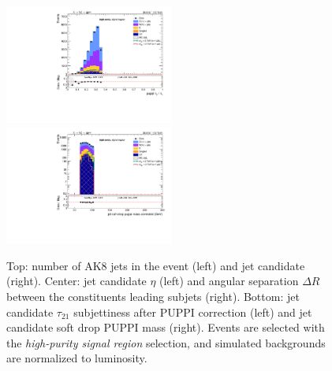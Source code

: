 \begin{figure}[!htb]
\begin{center}
    \includegraphics[width=0.495\textwidth]{plots/v9_thesis/XVZnnhpSR/FatJet1_puppiTau21.pdf}
    \includegraphics[width=0.495\textwidth]{plots/v9_thesis/XVZnnhpSR/FatJet1_softdropPuppiMassCorr.pdf}

    \caption{Top: number of AK8 jets in the event (left) and \V jet candidate \pt (right). Center: \V jet candidate $\eta$ (left) and angular separation $\Delta R$ between the constituents leading subjets (right). Bottom: \V jet candidate $\tau_{21}$ subjettiness after PUPPI correction (left) and \V jet candidate soft drop PUPPI mass (right). Events are selected with the \emph{high-purity signal region} selection, and simulated backgrounds are normalized to luminosity.}
  \end{center}
\end{figure}

\clearpage

